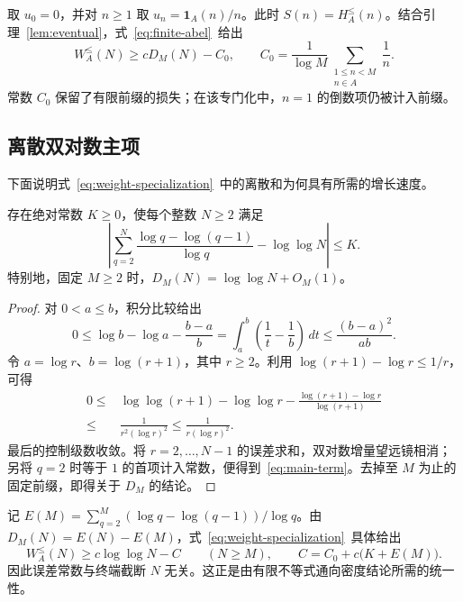 取 $u_0=0$，并对 $n\ge1$ 取 $u_n=\mathbf1_A(n)/n$。此时 $S(n)=H_A^{\le}(n)$。结合引理~\ref{lem:eventual}，式~\eqref{eq:finite-abel}~给出
\begin{equation}\label{eq:weight-specialization}
 W_A^{\le}(N)\ge cD_M(N)-C_0,\qquad
 C_0=\frac1{\log M}\sum_{\substack{1\le n<M\\n\in A}}\frac1n.
\end{equation}
常数 $C_0$ 保留了有限前缀的损失；在该专门化中，$n=1$ 的倒数项仍被计入前缀。

\subsection{离散双对数主项}
下面说明式~\eqref{eq:weight-specialization}~中的离散和为何具有所需的增长速度。
\begin{lemma}\label{lem:main-term}
存在绝对常数 $K\ge0$，使每个整数 $N\ge2$ 满足
\begin{equation}\label{eq:main-term}
 \left|\sum_{q=2}^{N}\frac{\log q-\log(q-1)}{\log q}
       -\log\log N\right|\le K.
\end{equation}
特别地，固定 $M\ge2$ 时，$D_M(N)=\log\log N+O_M(1)$。
\end{lemma}
\begin{proof}
对 $0<a\le b$，积分比较给出
\[
 0\le\log b-\log a-\frac{b-a}{b}
 =\int_a^b\left(\frac1t-\frac1b\right)\,dt
 \le\frac{(b-a)^2}{ab}.
\]
令 $a=\log r$、$b=\log(r+1)$，其中 $r\ge2$。利用
$\log(r+1)-\log r\le1/r$，可得
\begin{equation}\label{eq:increment-error}
\begin{split}
 0\le{}&\log\log(r+1)-\log\log r
       -\frac{\log(r+1)-\log r}{\log(r+1)}\\
 \le{}&\frac1{r^2(\log r)^2}
 \le\frac1{r(\log r)^2}.
\end{split}
\end{equation}
最后的控制级数收敛。将 $r=2,\ldots,N-1$ 的误差求和，双对数增量望远镜相消；另将 $q=2$ 时等于 $1$ 的首项计入常数，便得到~\eqref{eq:main-term}。去掉至 $M$ 为止的固定前缀，即得关于 $D_M$ 的结论。
\end{proof}

记 $E(M)=\sum_{q=2}^{M}(\log q-\log(q-1))/\log q$。由
$D_M(N)=E(N)-E(M)$，式~\eqref{eq:weight-specialization}~具体给出
\begin{equation}\label{eq:natural-bound}
 W_A^{\le}(N)\ge c\log\log N-C\qquad(N\ge M),
 \qquad C=C_0+c\bigl(K+E(M)\bigr).
\end{equation}
因此误差常数与终端截断 $N$ 无关。这正是由有限不等式通向密度结论所需的统一性。

